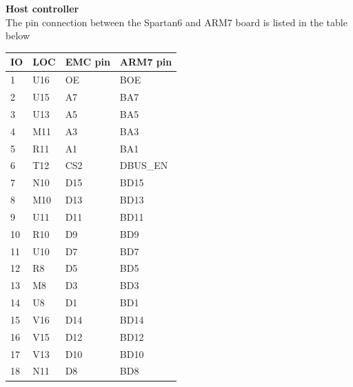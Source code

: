 \textbf{Host controller}\\
The pin connection between the Spartan6 and ARM7 board is listed in the table below
\begin{table}[H]
    \begin{tabular}{|p{3cm}|p{3cm}|p{3cm}|p{3cm}|}
        \hline
        \textbf{IO} & \textbf{LOC} & \textbf{EMC pin} & \textbf{ARM7 pin} \\ \hline
        1           & U16          & OE               & BOE               \\ \hline
        2           & U15          & A7               & BA7               \\ \hline
        3           & U13          & A5               & BA5               \\ \hline
        4           & M11          & A3               & BA3               \\ \hline
        5           & R11          & A1               & BA1               \\ \hline
        6           & T12          & CS2              & DBUS\_EN          \\ \hline
        7           & N10          & D15              & BD15              \\ \hline
        8           & M10          & D13              & BD13              \\ \hline
        9           & U11          & D11              & BD11              \\ \hline
        10          & R10          & D9               & BD9               \\ \hline
        11          & U10          & D7               & BD7               \\ \hline
        12          & R8           & D5               & BD5               \\ \hline
        13          & M8           & D3               & BD3               \\ \hline
        14          & U8           & D1               & BD1               \\ \hline
        15          & V16          & D14              & BD14              \\ \hline
        16          & V15          & D12              & BD12              \\ \hline
        17          & V13          & D10              & BD10              \\ \hline
        18          & N11          & D8               & BD8               \\ \hline

\end{tabular}
\end{table}
